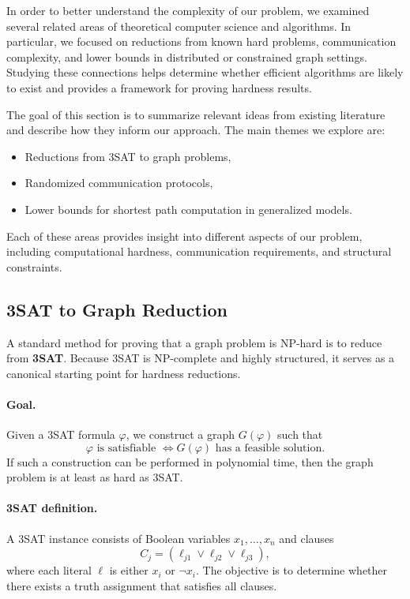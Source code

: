 In order to better understand the complexity of our problem, we examined several
related areas of theoretical computer science and algorithms. In particular, we
focused on reductions from known hard problems, communication complexity, and
lower bounds in distributed or constrained graph settings. Studying these
connections helps determine whether efficient algorithms are likely to exist
and provides a framework for proving hardness results.

The goal of this section is to summarize relevant ideas from existing literature
and describe how they inform our approach. The main themes we explore are:
\begin{itemize}
    \item Reductions from 3SAT to graph problems,
    \item Randomized communication protocols,
    \item Lower bounds for shortest path computation in generalized models.
\end{itemize}

Each of these areas provides insight into different aspects of our problem,
including computational hardness, communication requirements, and structural
constraints.

\subsection{3SAT to Graph Reduction}

A standard method for proving that a graph problem is NP-hard is to reduce from
\textbf{3SAT}. Because 3SAT is NP-complete and highly structured, it serves as a
canonical starting point for hardness reductions.

\paragraph{Goal.}
Given a 3SAT formula $\varphi$, we construct a graph $G(\varphi)$ such that
\[
\varphi \text{ is satisfiable } \iff G(\varphi) \text{ has a feasible solution}.
\]
If such a construction can be performed in polynomial time, then the graph
problem is at least as hard as 3SAT.

\paragraph{3SAT definition.}
A 3SAT instance consists of Boolean variables $x_1,\dots,x_n$ and clauses
\[
C_j = (\ell_{j1} \lor \ell_{j2} \lor \ell_{j3}),
\]
where each literal $\ell$ is either $x_i$ or $\neg x_i$. The objective is to
determine whether there exists a truth assignment that satisfies all clauses.

